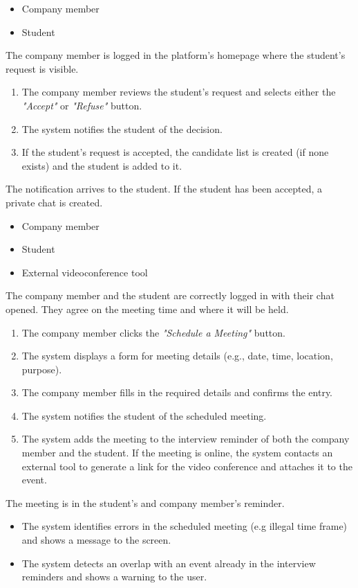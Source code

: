 {
    \begin{itemize}
        \item Company member
        \item Student
    \end{itemize}
}
{The company member is logged in the platform's homepage where the student's request is visible.}
{
    \begin{enumerate}
        \item The company member reviews the student's request and selects either the \textit{"Accept"} or \textit{"Refuse"} button.
        \item The system notifies the student of the decision.
        \item If the student's request is accepted, the candidate list is created (if none exists) and the student is added to it.
    \end{enumerate}
}
{The notification arrives to the student. If the student has been accepted, a private chat is created.}
{}
{}

{\begin{itemize}
    \item Company member
    \item Student
    \item External videoconference tool
\end{itemize}
}
{The company member and the student are correctly logged in with their chat opened. They agree on the meeting time and where it will be held.}
{
    \begin{enumerate}
        \item The company member clicks the \textit{"Schedule a Meeting"} button.
        \item The system displays a form for meeting details (e.g., date, time, location, purpose).
        \item The company member fills in the required details and confirms the entry.
        \item The system notifies the student of the scheduled meeting.
        \item The system adds the meeting to the interview reminder of both the company member and the student. If the meeting is online, the system contacts an external tool to generate a link for the video conference and attaches it to the event.
    \end{enumerate}
}
{The meeting is in the student's and company member's reminder.}
{
    \begin{itemize}
        \item The system identifies errors in the scheduled meeting (e.g illegal time frame) and shows a message to the screen.
        \item The system detects an overlap with an event already in the interview reminders and shows a warning to the user.
    \end{itemize}
}
{}

